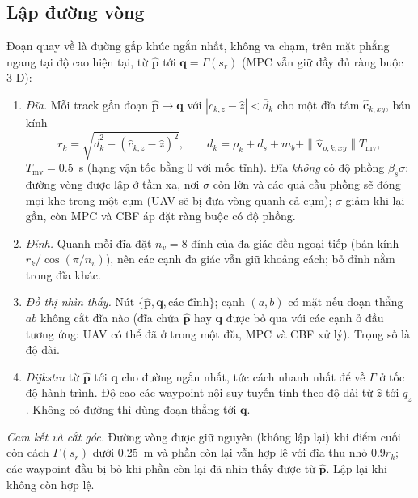 \documentclass[11pt,a4paper]{article}
\numberwithin{equation}{section}
\newcommand{\vb}[1]{\bm{#1}}
\theoremstyle{definition}
\theoremstyle{plain}
\theoremstyle{remark}
\begin{document}
\subsection{Lập đường vòng}
\label{sec:detour}
Đoạn quay về là đường gấp khúc ngắn nhất, không va chạm, trên mặt phẳng ngang tại độ cao hiện tại, từ $\hat{\vb p}$ tới $\vb q=\Gamma(s_r)$ (MPC vẫn giữ đầy đủ ràng buộc 3-D):
\begin{enumerate}
\item \emph{Đĩa.} Mỗi track gần đoạn $\hat{\vb p}\to\vb q$ với $|\hat c_{k,z}-\hat z|<\bar d_k$ cho một đĩa tâm $\hat{\vb c}_{k,xy}$, bán kính
\begin{equation}
r_k=\sqrt{\bar d_k^2-(\hat c_{k,z}-\hat z)^2},\qquad \bar d_k=\rho_k+d_s+m_b+\|\hat{\vb v}_{o,k,xy}\|T_{\text{mv}}, \label{eq:disc}
\end{equation}
$T_{\text{mv}}=0.5$~s (hạng vận tốc bằng 0 với mốc tĩnh). Đĩa \emph{không} có độ phồng $\beta_s\sigma$: đường vòng được lập ở tầm xa, nơi $\sigma$ còn lớn và các quả cầu phồng sẽ đóng mọi khe trong một cụm (UAV sẽ bị đưa vòng quanh cả cụm); $\sigma$ giảm khi lại gần, còn MPC và CBF áp đặt ràng buộc có độ phồng.
\item \emph{Đỉnh.} Quanh mỗi đĩa đặt $n_v=8$ đỉnh của đa giác đều ngoại tiếp (bán kính $r_k/\cos(\pi/n_v)$), nên các cạnh đa giác vẫn giữ khoảng cách; bỏ đỉnh nằm trong đĩa khác.
\item \emph{Đồ thị nhìn thấy.} Nút $\{\hat{\vb p},\vb q,\text{các đỉnh}\}$; cạnh $(a,b)$ có mặt nếu đoạn thẳng $ab$ không cắt đĩa nào (đĩa chứa $\hat{\vb p}$ hay $\vb q$ được bỏ qua với các cạnh ở đầu tương ứng: UAV có thể đã ở trong một đĩa, MPC và CBF xử lý). Trọng số là độ dài.
\item \emph{Dijkstra} từ $\hat{\vb p}$ tới $\vb q$ cho đường ngắn nhất, tức cách nhanh nhất để về $\Gamma$ ở tốc độ hành trình. Độ cao các waypoint nội suy tuyến tính theo độ dài từ $\hat z$ tới $q_z$. Không có đường thì dùng đoạn thẳng tới $\vb q$.
\end{enumerate}
\emph{Cam kết và cắt góc.} Đường vòng được giữ nguyên (không lập lại) khi điểm cuối còn cách $\Gamma(s_r)$ dưới 0.25~m và phần còn lại vẫn hợp lệ với đĩa thu nhỏ $0.9r_k$; các waypoint đầu bị bỏ khi phần còn lại đã nhìn thấy được từ $\hat{\vb p}$. Lập lại khi không còn hợp lệ.
\end{document}
